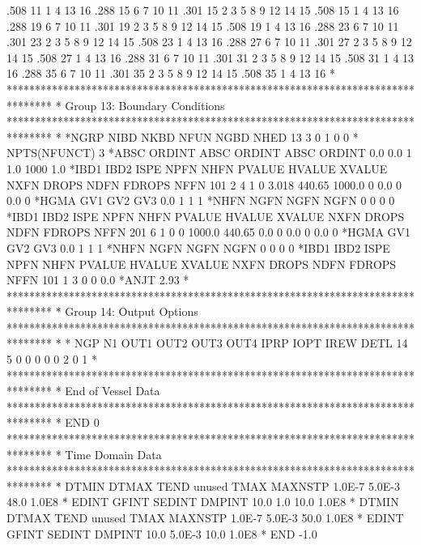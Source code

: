  .508   11    1    4   13   16
 .288   15    6    7   10   11
 .301   15    2    3    5    8    9   12   14   15
 .508   15    1    4   13   16
 .288   19    6    7   10   11
 .301   19    2    3    5    8    9   12   14   15
 .508   19    1    4   13   16
 .288   23    6    7   10   11
 .301   23    2    3    5    8    9   12   14   15
 .508   23    1    4   13   16
 .288   27    6    7   10   11
 .301   27    2    3    5    8    9   12   14   15
 .508   27    1    4   13   16
 .288   31    6    7   10   11
 .301   31    2    3    5    8    9   12   14   15
 .508   31    1    4   13   16
 .288   35    6    7   10   11
 .301   35    2    3    5    8    9   12   14   15
 .508   35    1    4   13   16
*
********************************************************************************
* Group 13: Boundary Conditions
********************************************************************************
*
*NGRP NIBD NKBD NFUN NGBD NHED     
   13    3    0    1    0    0
* NPTS(NFUNCT)
    3
*ABSC    ORDINT ABSC    ORDINT ABSC    ORDINT
  0.0       0.0    1       1.0 1000       1.0
*IBD1 IBD2 ISPE NPFN NHFN    PVALUE    HVALUE    XVALUE NXFN     DROPS NDFN    FDROPS NFFN
  101    2    4    1    0     3.018    440.65    1000.0    0       0.0    0       0.0    0
*HGMA  GV1  GV2  GV3
  0.0    1    1    1
*NHFN NGFN NGFN NGFN
    0    0    0    0
*IBD1 IBD2 ISPE NPFN NHFN    PVALUE    HVALUE    XVALUE NXFN     DROPS NDFN    FDROPS NFFN
  201    6    1    0    0    1000.0    440.65       0.0    0       0.0    0       0.0    0
*HGMA  GV1  GV2  GV3
  0.0    1    1    1
*NHFN NGFN NGFN NGFN
    0    0    0    0
*IBD1 IBD2 ISPE NPFN NHFN    PVALUE    HVALUE    XVALUE NXFN     DROPS NDFN    FDROPS NFFN
  101    1    3    0    0       0.0
*ANJT
 2.93
*
********************************************************************************
* Group 14: Output Options
********************************************************************************
*
* NGP   N1 OUT1 OUT2 OUT3 OUT4 IPRP IOPT IREW DETL
   14    5    0    0    0    0    0    2    0    1
*
********************************************************************************
* End of Vessel Data
********************************************************************************
*  END
     0
********************************************************************************
* Time Domain Data
********************************************************************************
*        DTMIN         DTMAX          TEND        unused          TMAX   MAXNSTP
        1.0E-7        5.0E-3          48.0                       1.0E8
*        EDINT         GFINT        SEDINT        DMPINT
          10.0           1.0          10.0         1.0E8
*        DTMIN         DTMAX          TEND        unused          TMAX   MAXNSTP
        1.0E-7        5.0E-3          50.0                       1.0E8
*        EDINT         GFINT        SEDINT        DMPINT
          10.0        5.0E-3          10.0         1.0E8
*          END
          -1.0
